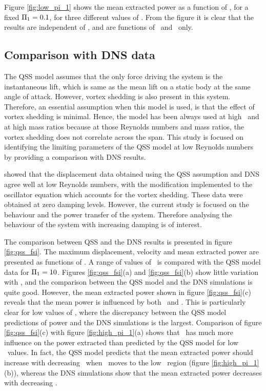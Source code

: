 Figure \ref{fig:low_pi_1} shows the mean extracted power as a function of \massdamp, for a fixed $\Pi_1 = 0.1$, for three different values of \mstar. From the figure it is clear that the results are independent of \mstar, and are functions of \massstiff\ and \massdamp\ only.



\subsection{Comparison with DNS data}
\label{sec:dns}

The QSS model assumes that the only force driving the system is the instantaneous lift, which is same as the mean lift on a static body at the same angle of attack. However, vortex shedding is also present in this system. Therefore, an essential assumption when this model is used, is that the effect of vortex shedding is minimal. Hence, the model has been always used at high \reynoldsnumber \ and  at high mass ratios because at those Reynolds numbers and mass ratios, the vortex shedding does not correlate across the span. This study is focused on identifying the limiting parameters of the QSS model at low Reynolds numbers by providing a comparison with DNS results. 

\citet{Joly2012} showed that the displacement data obtained using the QSS assumption and DNS agree well at low Reynolds numbers, with the modification implemented to the oscillator equation which accounts for the vortex shedding. These data were obtained at zero damping levels. However, the current study is focused on the behaviour and the power transfer of the system. Therefore analysing the behaviour of the system with increasing damping is of interest.

The comparison between QSS and the DNS results is presented in figure \ref{fig:qss_fsi}. The maximum displacement, velocity and mean extracted power are presented as functions of \massdamp. A range of values of \massstiff\ is compared with the QSS model data for $\Pi_1 = 10$. Figures \ref{fig:qss_fsi}(a) and \ref{fig:qss_fsi}(b) show little variation with \massstiff, and the comparison between the QSS model and the DNS simulations is quite good. However, the mean extracted power shown in figure \ref{fig:qss_fsi}(c) reveals that the mean power is influenced by both \massstiff\ and \massdamp. This is particularly clear for low values of \massstiff, where the discrepancy between the QSS model predictions of power and the DNS simulations is the largest. Comparison of figure \ref{fig:qss_fsi}(c) with figure \ref{fig:high_pi_1}(a) shows that \massstiff\ has much more influence on the power extracted than predicted by the QSS model for low \massstiff \ values. In fact, the QSS model predicts that the mean extracted power should increase with decreasing \massstiff\ when \massstiff\ moves to the low \massstiff\ region (figure \ref{fig:high_pi_1}(b)), whereas the DNS simulations show that the mean extracted power decreases with decreasing \massstiff.

